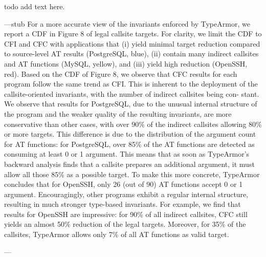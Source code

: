 todo add text here. 

---stub
For a more accurate view of the invariants enforced by
TypeArmor, we report a CDF in Figure 8 of legal callsite
targets. For clarity, we limit the CDF to CFI and CFC with
applications that (i) yield minimal target reduction compared
to source-level AT results (PostgreSQL, blue), (ii) contain
many indirect callsites and AT functions (MySQL, yellow),
and (iii) yield high reduction (OpenSSH, red).
Based on the CDF of Figure 8, we observe that CFC
results for each program follow the same trend as CFI.
This is inherent to the deployment of the callsite-oriented
invariants, with the number of indirect callsites being con-
stant. We observe that results for PostgreSQL, due to the
unusual internal structure of the program and the weaker
quality of the resulting invariants, are more conservative
than other cases, with over 90\% of the indirect callsites
allowing 80\% or more targets. This difference is due to
the distribution of the argument count for AT functions: for
PostgreSQL, over 85\% of the AT functions are detected as
consuming at least 0 or 1 argument. This means that as
soon as TypeArmor’s backward analysis finds that a callsite
prepares an additional argument, it must allow all those
85\% as a possible target. To make this more concrete,
TypeArmor concludes that for OpenSSH, only 26 (out of
90) AT functions accept 0 or 1 argument. Encouragingly,
other programs exhibit a regular internal structure, resulting
in much stronger type-based invariants. For example, we
find that results for OpenSSH are impressive: for 90\% of all
indirect callsites, CFC still yields an almost 50\% reduction
of the legal targets. Moreover, for 35\% of the callsites,
TypeArmor allows only 7\% of all AT functions as valid
target.

---

